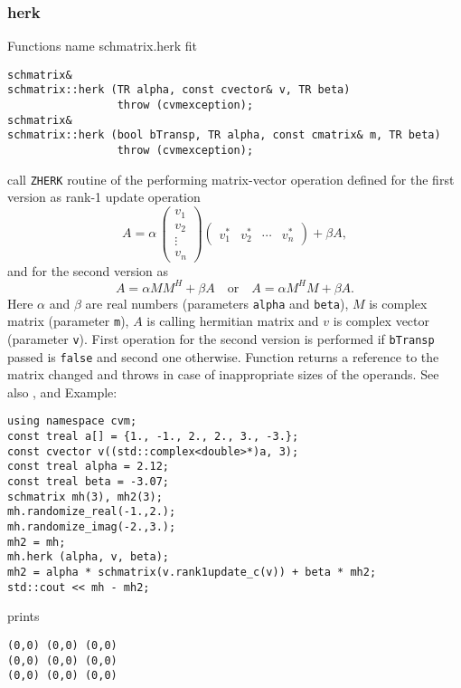 \subsubsection{herk}
Functions%
\pdfdest name {schmatrix.herk} fit
\begin{verbatim}
schmatrix& 
schmatrix::herk (TR alpha, const cvector& v, TR beta) 
                 throw (cvmexception);
schmatrix& 
schmatrix::herk (bool bTransp, TR alpha, const cmatrix& m, TR beta)
                 throw (cvmexception);
\end{verbatim}
call \verb"ZHERK" routine of the
performing  matrix-vector operation defined for the first version as
rank-1 update operation
\begin{equation*}
A=\alpha\,\begin{pmatrix}
v_1 \\
v_2 \\
\vdots \\
v_n
\end{pmatrix}
\begin{pmatrix}
v_1^* & v_2^* & \cdots & v_n^*
\end{pmatrix} + \beta A,
\end{equation*}
and for the second version as
\begin{equation*}
A=\alpha MM^H + \beta A\quad\text{or}\quad A=\alpha M^HM + \beta A.
\end{equation*}
Here $\alpha$ and $\beta$ are real numbers 
(parameters \verb"alpha" and \verb"beta"),
$M$ is  complex matrix (parameter \verb"m"),
$A$ is  calling hermitian matrix
and $v$ is  complex vector (parameter \verb"v").
First operation for the second version 
is performed if \verb"bTransp" passed
is \verb"false" and second one otherwise.
Function
returns a reference to the matrix changed and throws
in case of inappropriate sizes of the operands.
See also
,
 and 
Example:
\begin{Verbatim}
using namespace cvm;
const treal a[] = {1., -1., 2., 2., 3., -3.};
const cvector v((std::complex<double>*)a, 3);
const treal alpha = 2.12;
const treal beta = -3.07;
schmatrix mh(3), mh2(3);
mh.randomize_real(-1.,2.);
mh.randomize_imag(-2.,3.);
mh2 = mh;
mh.herk (alpha, v, beta);
mh2 = alpha * schmatrix(v.rank1update_c(v)) + beta * mh2;
std::cout << mh - mh2;
\end{Verbatim}
prints
\begin{Verbatim}
(0,0) (0,0) (0,0)
(0,0) (0,0) (0,0)
(0,0) (0,0) (0,0)
\end{Verbatim}
